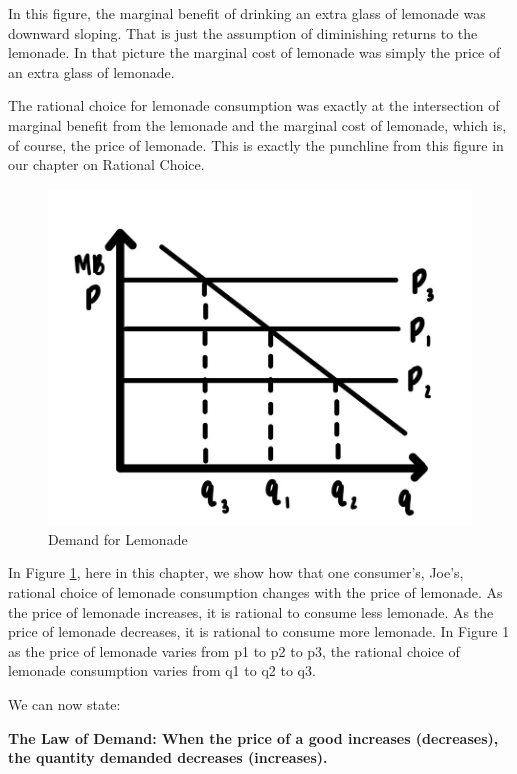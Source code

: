 \documentclass[
]{book}
\begin{document}
In this figure, the marginal benefit of drinking an extra glass of lemonade was downward sloping. That is just the assumption of diminishing returns to the lemonade. In that picture the marginal cost of lemonade was simply the price of an extra glass of lemonade.

The rational choice for lemonade consumption was exactly at the intersection of marginal benefit from the lemonade and the marginal cost of lemonade, which is, of course, the price of lemonade. This is exactly the punchline from this figure in our chapter on Rational Choice.

\begin{figure}

{\centering \includegraphics[width=0.75\linewidth]{img/ch3/fig2} 

}

\caption{Demand for Lemonade}\label{fig:fig302}
\end{figure}

In Figure \ref{fig:fig302}, here in this chapter, we show how that one consumer's, Joe's, rational choice of lemonade consumption changes with the price of lemonade. As the price of lemonade increases, it is rational to consume less lemonade. As the price of lemonade decreases, it is rational to consume more lemonade. In Figure 1 as the price of lemonade varies from p1 to p2 to p3, the rational choice of lemonade consumption varies from q1 to q2 to q3.

We can now state:

\begin{iucolor}
\textbf{The Law of Demand: When the price of a good increases (decreases), the quantity demanded decreases (increases).}

\end{iucolor}
\end{document}
